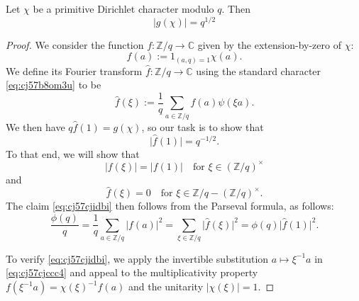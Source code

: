 \documentclass[reqno]{amsart}  \numberwithin{theorem}{section} \numberwithin{equation}{section}
\begin{document}
\begin{theorem}\label{theorem:cj57ckejar}
  Let $\chi$ be a primitive Dirichlet character modulo $q$.  Then
  \begin{equation*}
\lvert g (\chi)  \rvert = q^{1/2} 
\end{equation*}
\end{theorem}
\begin{proof}
  We consider the function $f : \mathbb{Z} / q \rightarrow \mathbb{C}$ given by the extension-by-zero of $\chi$:
  \begin{equation*}
    f(a) := 1_{(a, q) = 1} \chi(a).
  \end{equation*}
  We define its Fourier transform $\hat{f} : \mathbb{Z} / q \rightarrow \mathbb{C}$ using the standard character \eqref{eq:cj57b8om3u} to be
  \begin{equation}\label{eq:cj57cjccc4}
    \hat{f}(\xi) := \frac{1}{q} \sum_{a \in \mathbb{Z} / q} f (a) \psi (\xi a).
  \end{equation}
  We then have $q \hat{f}(1) = g(\chi)$, so our task is to show that
  \begin{equation*}
    \lvert \hat{f} (1)  \rvert = q^{-1/2}.
  \end{equation*}
  To that end, we will show that
  \begin{equation}\label{eq:cj57cjidbi}
    \lvert f(\xi) \rvert = \lvert f(1) \rvert \quad \text{for } \xi \in (\mathbb{Z} / q)^\times 
  \end{equation}
  and
  \begin{equation}\label{eq:cj57cjmbi7}
    \hat{f}(\xi) = 0 \quad \text{for } \xi \in \mathbb{Z} / q - (\mathbb{Z} / q )^\times .
  \end{equation}
  The claim \eqref{eq:cj57cjidbi} then follows from the Parseval formula, as follows:
  \begin{equation*}
    \frac{\phi(q)}{q}
    =
    \frac{1}{q} \sum_{a \in \mathbb{Z} / q} \lvert f (a)  \rvert^2
    = \sum_{\xi \in \mathbb{Z} / q} \lvert \hat{f} (\xi)  \rvert^2
    = \phi (q) \lvert \hat{f} (1) \rvert^2.
  \end{equation*}

  To verify \eqref{eq:cj57cjidbi}, we apply the invertible substitution $a \mapsto \xi^{-1} a$ in \eqref{eq:cj57cjccc4} and appeal to the multiplicativity property $f (\xi^{-1} a) = \chi (\xi )^{-1} f (a) $ and the unitarity $\lvert \chi (\xi ) \rvert = 1$.


\end{proof}
\end{document}

